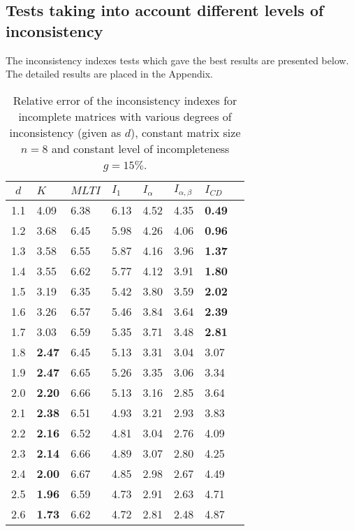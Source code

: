 \subsection{Tests taking into account different levels of inconsistency}
The inconsistency indexes tests which gave the best results are presented below. The detailed results are placed in the Appendix.
\begin{table}[!ht]
\begin{center}
\caption{Relative error of the inconsistency indexes for incomplete matrices with various degrees of inconsistency (given as $d$), constant matrix size $n=8$ and constant level of incompleteness $g=15\%$.}
\label{tab:results3}
\begin{tabular}{|c||lllll||l|c|}
\hline $d$ & $\textit{K}$ & $\textit{MLTI}$ & $I_1$ & $I_{\alpha}$ & $I_{\alpha,\beta}$ & $I_{CD}$  \\ \hline \hline
1.1 & 4.09 & 6.38 & 6.13 & 4.52 & 4.35 & \textbf{0.49} \\ \hline
1.2 & 3.68 & 6.45 & 5.98 & 4.26 & 4.06 & \textbf{0.96} \\ \hline
1.3 & 3.58 & 6.55 & 5.87 & 4.16 & 3.96 & \textbf{1.37} \\ \hline
1.4 & 3.55 & 6.62 & 5.77 & 4.12 & 3.91 & \textbf{1.80} \\ \hline
1.5 & 3.19 & 6.35 & 5.42 & 3.80 & 3.59 & \textbf{2.02} \\ \hline
1.6 & 3.26 & 6.57 & 5.46 & 3.84 & 3.64 & \textbf{2.39} \\ \hline
1.7 & 3.03 & 6.59 & 5.35 & 3.71 & 3.48 & \textbf{2.81} \\ \hline
1.8 & \textbf{2.47} & 6.45 & 5.13 & 3.31 & 3.04 & 3.07 \\ \hline
1.9 & \textbf{2.47} & 6.65 & 5.26 & 3.35 & 3.06 & 3.34 \\ \hline
2.0 & \textbf{2.20} & 6.66 & 5.13 & 3.16 & 2.85 & 3.64 \\ \hline
2.1 & \textbf{2.38} & 6.51 & 4.93 & 3.21 & 2.93 & 3.83 \\ \hline
2.2 & \textbf{2.16} & 6.52 & 4.81 & 3.04 & 2.76 & 4.09 \\ \hline
2.3 & \textbf{2.14} & 6.66 & 4.89 & 3.07 & 2.80 & 4.25 \\ \hline
2.4 & \textbf{2.00} & 6.67 & 4.85 & 2.98 & 2.67 & 4.49 \\ \hline
2.5 & \textbf{1.96} & 6.59 & 4.73 & 2.91 & 2.63 & 4.71 \\ \hline
2.6 & \textbf{1.73} & 6.62 & 4.72 & 2.81 & 2.48 & 4.87 \\ \hline

\end{tabular}
\end{center}
\end{table}
